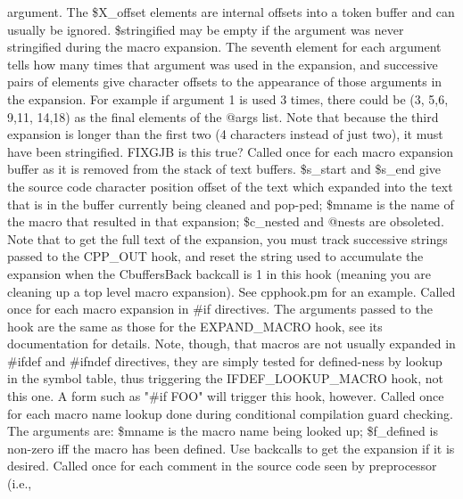 argument.  The \$X\_\-offset elements are internal offsets into a token buffer
and can usually be ignored.  \$stringified may be empty if the argument was
never stringified during the macro expansion.  The seventh element for each
argument tells how many times that argument was used in the expansion, and
successive pairs of elements give character offsets to the appearance of those
arguments in the expansion.  For example if argument 1 is used 3 times, there could
be (3, 5,6, 9,11,  14,18) as the final elements of the @args list.  Note that
because the third expansion is longer than the first two (4 characters instead of
just two), it must have been stringified. FIXGJB is this true?
Called once for each macro expansion buffer as it is removed 
from the stack of text buffers.  \$s\_\-start and \$s\_\-end give the source
code character position offset of the text which expanded into the text
that is in the buffer currently being cleaned and pop-ped;  \$mname is the
name of the macro that resulted in that expansion; \$c\_\-nested and @nests
are obsoleted.  Note that to get the full text of the expansion, you must
track successive strings passed to the CPP\_\-OUT hook, and reset the
string used to accumulate the expansion when the CbuffersBack backcall
is 1 in this hook (meaning you are cleaning up a top level macro expansion).
See cpphook.pm for an example.
Called once for each macro expansion in \#if directives.  The arguments
passed to the hook are the same as those for the EXPAND\_\-MACRO hook, see its
documentation for details.  Note, though, that macros are not usually
expanded in \#ifdef and \#ifndef directives, they are simply tested for
defined-ness by lookup in the symbol table, thus triggering the IFDEF\_\-LOOKUP\_\-MACRO
hook, not this one.  A form such as "\#if FOO" will trigger this hook, however.
Called once for each macro name lookup done during conditional compilation
guard checking.  The arguments are:
\$mname is the macro name being looked up; \$f\_\-defined is non-zero
iff the macro has been defined.  Use backcalls to get the expansion if
it is desired.
Called once for each comment in the source code seen by preprocessor (i.e.,
